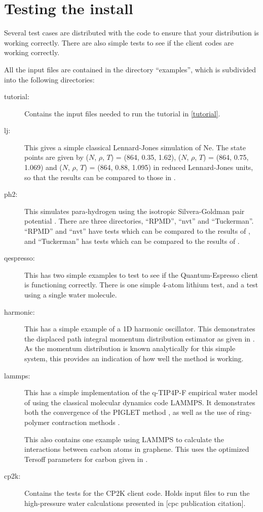 \documentclass[11pt,english,fleqn]{report}
\begin{document}
\section{Testing the install}

\label{tests}

Several test cases are distributed with the code to ensure that your
distribution is working correctly. There are also simple tests to
see if the client codes are working correctly.

All the input files are contained in the directory {}``examples'', which is
subdivided into the following directories:
\begin{description}
\item[{tutorial:}] Contains the input files needed to run the
tutorial in \ref{tutorial}.
\item [{lj:}] This gives a simple classical Lennard-Jones simulation of
Ne. The state points are given by (\(N\), \(\rho\), \(T\)) = (864, 0.35,
1.62), (\(N\), \(\rho\), \(T\)) = (864, 0.75, 1.069) and (\(N\), \(\rho\), \(T\))
= (864, 0.88, 1.095) in reduced Lennard-Jones units, so that the results
can be compared to those in \cite{lverlet67pr}.
\item [{ph2:}] This simulates para-hydrogen using the isotropic Silvera-Goldman
pair potential \cite{silv-gold78jcp}. There are three directories, {}``RPMD'', {}``nvt''
and {}``Tuckerman''. {}``RPMD'' and {}``nvt'' have tests which
can be compared to the results of \cite{mill-mano05jcp}, and {}``Tuckerman''
has tests which can be compared to the results of \cite{mart+99jcp}.
\item [{qespresso:}] This has two simple examples to test to see if the Quantum-Espresso
client is functioning correctly. There is one simple 4-atom lithium
test, and a test using a single water molecule.
\item [{harmonic:}] This has a simple example of a 1D harmonic oscillator.
This demonstrates the displaced path integral momentum distribution
estimator as given in \cite{linlin+10prl}. As the momentum distribution
is known analytically for this simple system, this provides an indication
of how well the method is working.
\item [{lammps:}] This has a simple implementation of the q-TIP4P-F empirical
water model of \cite{habe+09jcp} using the classical molecular dynamics
code LAMMPS. It demonstrates both the convergence of the PIGLET method
\cite{ceri-mano12prl}, as well as the use of ring-polymer contraction
methods \cite{mark-mano08jcp}.

This also contains one example using LAMMPS to calculate the interactions
between carbon atoms in graphene. This uses the optimized Tersoff 
parameters for carbon given in \cite{lind-broi10prb,errlind-broi10prb}.
\item [{cp2k:}] Contains the tests for the CP2K client code. Holds input files
to run the high-pressure water calculations 
presented in [cpc publication citation].
\end{description}
\end{document}
